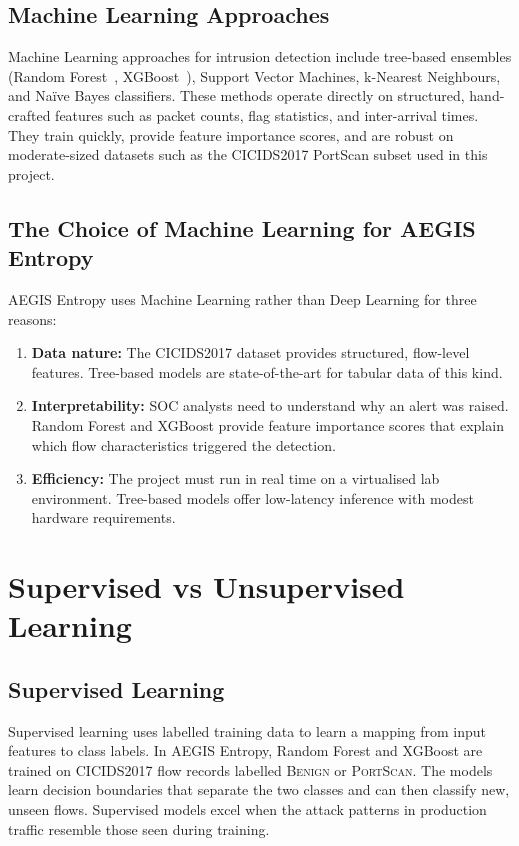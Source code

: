 \subsection{Machine Learning Approaches}

Machine Learning approaches for intrusion detection include tree-based ensembles (Random Forest~\cite{breiman2001}, XGBoost~\cite{chen2016}), Support Vector Machines, k-Nearest Neighbours, and Na\"{i}ve Bayes classifiers. These methods operate directly on structured, hand-crafted features such as packet counts, flag statistics, and inter-arrival times. They train quickly, provide feature importance scores, and are robust on moderate-sized datasets such as the CICIDS2017 PortScan subset used in this project.

\subsection{The Choice of Machine Learning for AEGIS Entropy}

AEGIS Entropy uses Machine Learning rather than Deep Learning for three reasons:

\begin{enumerate}
    \item \textbf{Data nature:} The CICIDS2017 dataset provides structured, flow-level features. Tree-based models are state-of-the-art for tabular data of this kind.
    \item \textbf{Interpretability:} SOC analysts need to understand why an alert was raised. Random Forest and XGBoost provide feature importance scores that explain which flow characteristics triggered the detection.
    \item \textbf{Efficiency:} The project must run in real time on a virtualised lab environment. Tree-based models offer low-latency inference with modest hardware requirements.
\end{enumerate}

\section{Supervised vs Unsupervised Learning}\label{sec:supervised_unsupervised}

\subsection{Supervised Learning}

Supervised learning uses labelled training data to learn a mapping from input features to class labels. In AEGIS Entropy, Random Forest and XGBoost are trained on CICIDS2017 flow records labelled \textsc{Benign} or \textsc{PortScan}. The models learn decision boundaries that separate the two classes and can then classify new, unseen flows. Supervised models excel when the attack patterns in production traffic resemble those seen during training.

